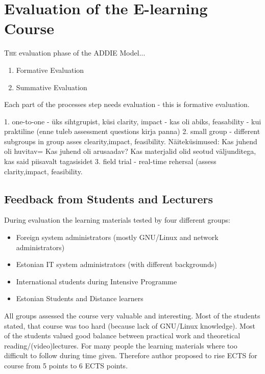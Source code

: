 \chapter{Evaluation of the E-learning Course}
\label{Evaluation of the E-learning Course}
\lettrine[lraise=0.1, nindent=0em, slope=-.5em]{\color{Violet}T}{he}  evaluation phase of the ADDIE Model...
\begin{enumerate}
\item Formative Evaluation
\item Summative Evaluation
\end{enumerate}

Each part of the processes step needs evaluation - this is formative evaluation.

1. one-to-one - üks sihtgrupist, küsi clarity, impact - kas oli abiks, feasability - kui praktiline (enne tuleb assessment questions kirja panna)
2. small group  - different subgroups in group asses clearity,impact, feasibility. Näiteküsimused: Kas juhend oli huvitav= Kas juhend oli arusaadav? Kas materjalid olid seotud väljunditega, kas said piisavalt tagasisidet
3. field trial -  real-time rehersal (assess clarity,impact, feasibility.


\section{Feedback from Students and Lecturers}

During evaluation the learning materials tested by four different groups:

\begin{itemize}
\item Foreign system administrators (mostly GNU/Linux and network administrators)
\item Estonian IT system administrators (with different backgrounds)
\item International students during Intensive Programme
\item Estonian Students and Distance learners
\end{itemize}


All groups assessed the course very valuable and interesting. Most of the students stated, that course was too hard (because lack of GNU/Linux knowledge). Most of the students valued good balance between practical work and theoretical reading/(video)lectures. For many people the learning materials where too difficult to follow during time given. Therefore author proposed to rise \gls{ECTS} for course from 5 points  to 6 \gls{ECTS} points.



